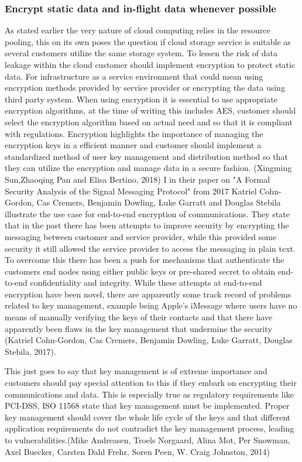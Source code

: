 \documentclass{article}
\begin{document}
\subsubsection{Encrypt static data and in-flight data whenever possible}
As stated earlier the very nature of cloud computing relies in the resource pooling, this on its own poses the question if cloud storage service is suitable as several customers utilize the same storage system. To lessen the risk of data leakage within the cloud customer should implement encryption to protect static data. For infrastructure as a service environment that could mean using encryption methods provided by service provider or encrypting the data using third party system. When using encryption it is essential to use appropriate encryption algorithms, at the time of writing this includes AES, customer should select the encryption algorithm based on actual need and so that it is compliant with regulations. Encryption highlights the importance of managing the encryption keys in a efficient manner and customer should implement a standardized method of user key management and distribution method so that they can utilize the encryption and manage data in a secure fashion. (Xingming Sun,Zhaoqing Pan and Elisa Bertino, 2018)
I in their paper on "A Formal Security Analysis of the Signal Messaging Protocol" from 2017 Katriel Cohn-Gordon, Cas Cremers, Benjamin Dowling, Luke Garratt and Douglas Stebila illustrate the use case for end-to-end encryption of communications.
They state that in the past there has been attempts to improve security by encrypting the messaging between customer and service provider, while this provided some security it still allowed the service provider to access the messaging in plain text.
To overcome this there has been a push for mechanisms that authenticate the customers end nodes using either public keys or pre-shared secret to obtain end-to-end confidentiality and integrity.
While these attempts at end-to-end encryption have been novel, there are apparently some track record of problems related to key management, example being Apple's iMessage where users have no means of manually verifying the keys of their contacts and that there have apparently been flaws in the key management that undermine the security (Katriel Cohn-Gordon, Cas Cremers, Benjamin Dowling, Luke Garratt, Douglas Stebila, 2017).
\par
This just goes to say that key management is of extreme importance and customers should pay special attention to this if they embark on encrypting their communications and data. This is especially true as regulatory requirements like PCI-DSS, ISO 11568 state that key management must be implemented. Proper key management should cover the whole life cycle of the keys and that different application requirements do not contradict the key management process, leading to vulnerabilities.(Mike Andreasen, Troels Norgaard, Alina Mot, Per Snowman, Axel Buecker, Carsten Dahl Frehr, Soren Peen, W. Craig Johnston, 2014)
\end{document}
